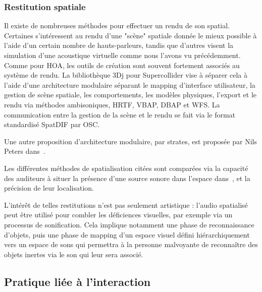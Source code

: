 \documentclass[french,12pt]{article}
\begin{document}
\subsubsection{Restitution spatiale}
Il existe de nombreuses méthodes pour effectuer un rendu de son spatial. Certaines s'intéressent au rendu d'une "scène" spatiale donnée le mieux possible à l'aide d'un certain nombre de hauts-parleurs, tandis que d'autres visent la simulation d'une acoustique virtuelle comme nous l'avons vu précédemment. Comme pour HOA, les outils de création sont souvent fortement associés au système de rendu. La bibliothèque 3Dj\cite{perez-lopez_3dj_2015} pour Supercollider vise à séparer cela à l'aide d'une architecture modulaire séparant le mapping d'interface utilisateur, la gestion de scène spatiale, les comportements, les modèles physiques, l'export et le rendu via méthodes ambisoniques, HRTF\cite{noisternig_3d_2003}, \ac{VBAP}, \ac{DBAP} et \ac{WFS}.
La communication entre la gestion de la scène et le rendu se fait via le format standardisé SpatDIF\cite{peters_spatial_2013} par OSC. %

Une autre proposition d'architecture modulaire, par strates, est proposée par Nils Peters dans~\cite{peters_stratified_2009}.

Les différentes méthodes de spatialisation citées sont comparées via la capacité des auditeurs à situer la présence d'une source sonore dans l'espace dans~\cite{bates_comparative_2007}, et la précision de leur localisation.

L'intérêt de telles restitutions n'est pas seulement artistique : l'audio spatialisé peut être utilisé pour combler les déficiences visuelles, par exemple via un processus de sonification\cite{tang_assistive_2014}. Cela implique notamment une phase de reconnaissance d'objets, puis une phase de mapping d'un espace visuel défini hiérarchiquement vers un espace de sons qui permettra à la personne malvoyante de reconnaître des objets inertes via le son qui leur sera associé.

\subsection{Pratique liée à l'interaction}

\end{document}
